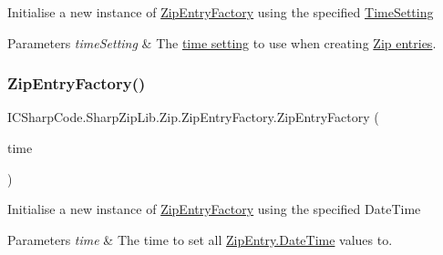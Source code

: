 Initialise a new instance of \hyperlink{class_i_c_sharp_code_1_1_sharp_zip_lib_1_1_zip_1_1_zip_entry_factory}{Zip\+Entry\+Factory} using the specified \hyperlink{class_i_c_sharp_code_1_1_sharp_zip_lib_1_1_zip_1_1_zip_entry_factory_a10d0f2a1e64abd09ea6abac4d34a9955}{Time\+Setting} 


\begin{DoxyParams}{Parameters}
{\em time\+Setting} & The \hyperlink{class_i_c_sharp_code_1_1_sharp_zip_lib_1_1_zip_1_1_zip_entry_factory_a10d0f2a1e64abd09ea6abac4d34a9955}{time setting} to use when creating \hyperlink{class_i_c_sharp_code_1_1_sharp_zip_lib_1_1_zip_1_1_zip_entry}{Zip entries}.\\
\hline
\end{DoxyParams}
\mbox{\label{class_i_c_sharp_code_1_1_sharp_zip_lib_1_1_zip_1_1_zip_entry_factory_a1712f61a0640060a85a7f9aa56935116}} 
\subsubsection{\texorpdfstring{Zip\+Entry\+Factory()}{ZipEntryFactory()}\hspace{0.1cm}{\footnotesize\ttfamily [3/3]}}
{\footnotesize\ttfamily I\+C\+Sharp\+Code.\+Sharp\+Zip\+Lib.\+Zip.\+Zip\+Entry\+Factory.\+Zip\+Entry\+Factory (\begin{DoxyParamCaption}\item[{Date\+Time}]{time }\end{DoxyParamCaption})\hspace{0.3cm}{\ttfamily [inline]}}



Initialise a new instance of \hyperlink{class_i_c_sharp_code_1_1_sharp_zip_lib_1_1_zip_1_1_zip_entry_factory}{Zip\+Entry\+Factory} using the specified Date\+Time 


\begin{DoxyParams}{Parameters}
{\em time} & The time to set all \hyperlink{class_i_c_sharp_code_1_1_sharp_zip_lib_1_1_zip_1_1_zip_entry_a1771dc696c0266c7ed4908246f3e1329}{Zip\+Entry.\+Date\+Time} values to.\\
\hline
\end{DoxyParams}


